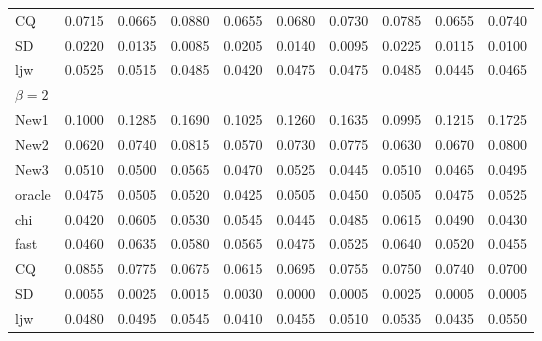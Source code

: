 \documentclass[review]{elsarticle}
\theoremstyle{plain}
\theoremstyle{definition}
\theoremstyle{remark}
\begin{document}
\begin{table}[ht]
\begin{tabular}{llllllllll}
CQ & 0.0715 & 0.0665 & 0.0880 & 0.0655 & 0.0680 & 0.0730 & 0.0785 & 0.0655 & 0.0740 \\ 
SD & 0.0220 & 0.0135 & 0.0085 & 0.0205 & 0.0140 & 0.0095 & 0.0225 & 0.0115 & 0.0100 \\ 
ljw & 0.0525 & 0.0515 & 0.0485 & 0.0420 & 0.0475 & 0.0475 & 0.0485 & 0.0445 & 0.0465 \\ 
    $\beta=2$\\
New1 & 0.1000 & 0.1285 & 0.1690 & 0.1025 & 0.1260 & 0.1635 & 0.0995 & 0.1215 & 0.1725 \\ 
New2 & 0.0620 & 0.0740 & 0.0815 & 0.0570 & 0.0730 & 0.0775 & 0.0630 & 0.0670 & 0.0800 \\ 
New3 & 0.0510 & 0.0500 & 0.0565 & 0.0470 & 0.0525 & 0.0445 & 0.0510 & 0.0465 & 0.0495 \\ 
oracle & 0.0475 & 0.0505 & 0.0520 & 0.0425 & 0.0505 & 0.0450 & 0.0505 & 0.0475 & 0.0525 \\ 
chi & 0.0420 & 0.0605 & 0.0530 & 0.0545 & 0.0445 & 0.0485 & 0.0615 & 0.0490 & 0.0430 \\ 
fast & 0.0460 & 0.0635 & 0.0580 & 0.0565 & 0.0475 & 0.0525 & 0.0640 & 0.0520 & 0.0455 \\ 
CQ & 0.0855 & 0.0775 & 0.0675 & 0.0615 & 0.0695 & 0.0755 & 0.0750 & 0.0740 & 0.0700 \\ 
SD & 0.0055 & 0.0025 & 0.0015 & 0.0030 & 0.0000 & 0.0005 & 0.0025 & 0.0005 & 0.0005 \\ 
ljw & 0.0480 & 0.0495 & 0.0545 & 0.0410 & 0.0455 & 0.0510 & 0.0535 & 0.0435 & 0.0550 \\ 
\bottomrule
\end{tabular}
\end{table}
\end{document}
